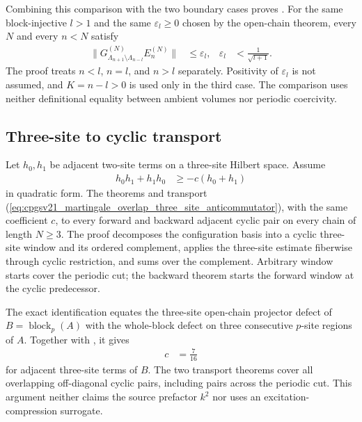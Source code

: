\documentclass{article}
\begin{document}
Combining this comparison with the two boundary cases proves
.
For the same block-injective $l>1$ and the same $\varepsilon_l\geq0$ chosen by
the open-chain theorem, every $N$ and every $n<N$ satisfy
\begin{align}
    \lVert G_{\Lambda_{n+1}\setminus\Lambda_{n-l}}^{(N)}E_n^{(N)}\rVert
     & \leq\varepsilon_l,
     &
    \varepsilon_l
     & <\frac{1}{\sqrt{l+1}}.
    \label{eq:cpgsv21_martingale_overlap_fixed_volume_c3}
\end{align}
The proof treats $n<l$, $n=l$, and $n>l$ separately.  Positivity of
$\varepsilon_l$ is not assumed, and $K=n-l>0$ is used only in the third case.
The comparison uses neither definitional equality between ambient volumes nor
periodic coercivity.

\subsection{Three-site to cyclic transport}

Let $h_0,h_1$ be adjacent two-site terms on a three-site Hilbert space. Assume
\begin{align}
    h_0h_1+h_1h_0
     & \geq-c(h_0+h_1)
    \label{eq:cpgsv21_martingale_overlap_three_site_anticommutator}
\end{align}
in quadratic form. The theorems
and
transport
(\ref{eq:cpgsv21_martingale_overlap_three_site_anticommutator}), with the same
coefficient $c$, to every forward and backward adjacent cyclic pair on every
chain of length $N\geq3$. The proof decomposes the configuration basis into a
cyclic three-site window and its ordered complement, applies the three-site
estimate fiberwise through cyclic restriction, and sums over the complement.
Arbitrary window starts cover the periodic cut; the backward theorem starts
the forward window at the cyclic predecessor.

The exact identification
 equates the
three-site open-chain projector defect of
$B=\operatorname{block}_p(A)$ with the whole-block defect on three consecutive
$p$-site regions of $A$. Together with
,
it gives
\begin{align}
    c & =\frac{7}{16}
    \label{eq:cpgsv21_martingale_overlap_three_block_coefficient}
\end{align}
for adjacent three-site terms of $B$. The two transport theorems cover all
overlapping off-diagonal cyclic pairs, including pairs across the periodic cut.
This argument neither claims the source prefactor $k^2$ nor uses an
excitation-compression surrogate.
\end{document}
